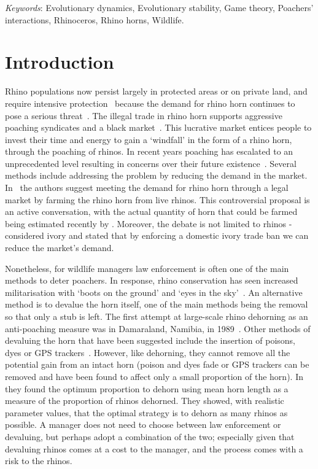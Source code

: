 \documentclass[10pt]{article}
\begin{document}
\textit{Keywords}:  Evolutionary dynamics, Evolutionary stability, Game theory,
Poachers' interactions, Rhinoceros, Rhino horns, Wildlife.
\newpage
\section{Introduction}\label{section:introduction}

Rhino populations now persist largely in protected areas or on private land, and
require intensive protection~\cite{Ferreira2014} because the demand for rhino
horn continues to pose a serious threat~\cite{Amin2006}. The illegal trade in rhino
horn supports aggressive poaching syndicates and a black market~\cite{Nowell1992, Warchol2003}.
This lucrative market entices people to invest their time and energy to gain a
`windfall' in the form of a rhino horn, through the poaching of rhinos. In recent
years poaching has escalated to an unprecedented level resulting in concerns over
their future existence~\cite{Duan2013,Smith1993}. Several methods
include addressing the problem by reducing the demand in the market. In~\cite{Duan2013}
the authors suggest meeting the demand for rhino horn through a legal market by
farming the rhino horn from live rhinos. This controversial proposal is an active
conversation, with the actual quantity of horn that could be farmed being estimated
recently by \cite{Taylor2017}. Moreover, the debate is not limited to rhinos -
\cite{Harvey2017} considered ivory and stated that by enforcing a domestic ivory
trade ban we can reduce the market's demand.

Nonetheless, for wildlife managers law enforcement is often one of the main methods
to deter poachers.
In response, rhino conservation has seen increased  militarisation with `boots on the
ground' and `eyes in the sky'~\citep{duffy_st}. An alternative method is to
devalue the horn itself, one of the main  methods being the removal so that only
a stub is left. The first attempt at large-scale rhino dehorning as an anti-poaching
measure was in Damaraland, Namibia, in 1989~\citep{Milner1992}. Other methods
of devaluing the horn that have been suggested include
the insertion of poisons, dyes or GPS trackers~\citep{Gill2010,Smith1993}. However,
like dehorning, they cannot remove all the potential gain from an intact horn 
(poison and dyes fade or GPS trackers can be removed and have been found to affect
only a small proportion of the horn).
In~\cite{Milner1992} they found the 
optimum proportion to dehorn using mean horn length as a measure of the 
proportion of rhinos dehorned. They showed, with realistic parameter values, 
that the optimal strategy is to dehorn as many rhinos as possible. 
A manager does not need to choose between law enforcement or devaluing, but
perhaps adopt a combination of the two; especially given that devaluing rhinos 
comes at a cost to the manager, and the process comes with a risk to the rhinos.
\end{document}
